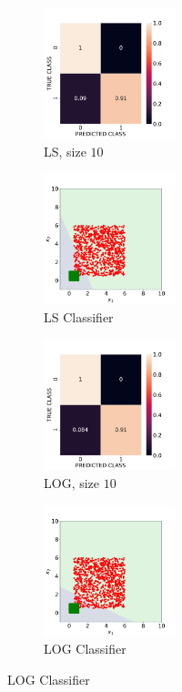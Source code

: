 \documentclass[12pt, a4 paper]{article}
\begin{document}

\label{prob:1.b}

\begin{figure}[!htbp]
\centering
    \begin{subfigure}[!htbp]{0.2\textwidth}
       \centering
       \includegraphics[width=1.5in]{../results/ex1/acc_LS_dataset_Uniform_size_10.pdf}
       \caption{LS, size $10$}
       \label{fig:LS_P1a_10}
    \end{subfigure}
\quad
    \begin{subfigure}[!htbp]{0.2\textwidth}
       \centering
       \includegraphics[width=1.5in]{../results/ex1/samples_LS_dataset_Uniform_size_10.pdf}
       \caption{LS Classifier}
       \label{fig:LSD_P1a_10}
    \end{subfigure}
\quad
    \begin{subfigure}[!htbp]{0.2\textwidth}
       \centering
       \includegraphics[width=1.5in]{../results/ex1/acc_LOG_dataset_Uniform_size_10.pdf}
       \caption{LOG, size $10$}
       \label{fig:LOG_P1a_10}
    \end{subfigure}
\quad
    \begin{subfigure}[!htbp]{0.2\textwidth}
       \centering
       \includegraphics[width=1.5in]{../results/ex1/samples_LOG_dataset_Uniform_size_10.pdf}
       \caption{LOG Classifier}
       \label{fig:LOGD_P1a_10}
    \end{subfigure}
    

\end{figure}
\end{document}
